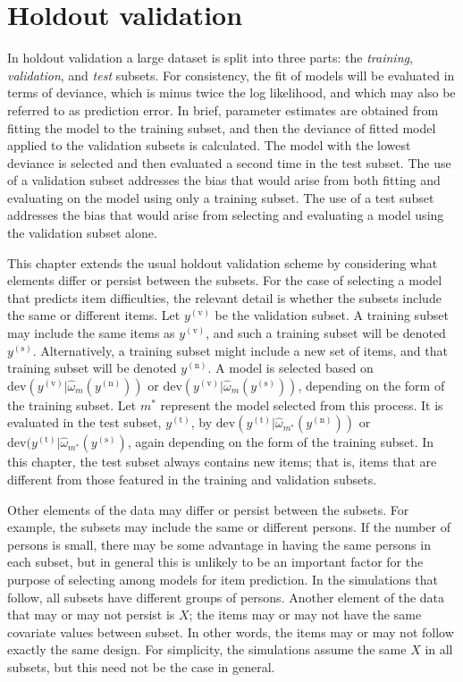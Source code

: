 \section{Holdout validation}

In holdout validation a large dataset is split into three parts: the \emph{training}, \emph{validation}, and \emph{test} subsets. 
For consistency, the fit of models will be evaluated in terms of deviance, which is minus twice the log likelihood, and which may also be referred to as prediction error.
In brief, parameter estimates are obtained from fitting the model to the training subset, and then the deviance of fitted model applied to the validation subsets is calculated. 
The model with the lowest deviance is selected and then evaluated a second time in the test subset.
The use of a validation subset addresses the bias that would arise from both fitting and evaluating on the model using only a training subset.
The use of a test subset addresses the bias that would arise from selecting and evaluating a model using the validation subset alone.

This chapter extends the usual holdout validation scheme by considering what elements differ or persist between the subsets. 
For the case of selecting a model that predicts item difficulties, the relevant detail is whether the subsets include the same or different items. 
Let $y^{(\mathrm{v})}$ be the validation subset. 
A training subset may include the same items as $y^{(\mathrm{v})}$, and such a training subset will be denoted $y^{(\mathrm{s})}$. 
Alternatively, a training subset might include a new set of items, and that training subset will be denoted $y^{(\mathrm{n})}$. 
A model is selected based on 
	$\mathrm{dev}(y^{(\mathrm{v})} | \hat \omega_m(y^{(\mathrm{n})}))$ or
	$\mathrm{dev}(y^{(\mathrm{v})} | \hat \omega_m(y^{(\mathrm{s})}))$, 
	depending on the form of the training subset.
Let $m^*$ represent the model selected from this process.
It is evaluated in the test subset, $y^{(\mathrm{t})}$, by 
	$\mathrm{dev}(y^{(\mathrm{t})} | \hat \omega_{m^*}(y^{(\mathrm{n})}))$ or
	$\mathrm{dev}(y^{(\mathrm{t})} | \hat \omega_{m^*}(y^{(\mathrm{s})})$, 
	again depending on the form of the training subset.
In this chapter, the test subset always contains new items; that is, items that are different from those featured in the training and validation subsets.

Other elements of the data may differ or persist between the subsets. For example, the subsets may include the same or different persons. If the number of persons is small, there may be some advantage in having the same persons in each subset, but in general this is unlikely to be an important factor for the purpose of selecting among models for item prediction. In the simulations that follow, all subsets have different groups of persons. Another element of the data that may or may not persist is $X$; the items may or may not have the same covariate values between subset. In other words, the items may or may not follow exactly the same design. For simplicity, the simulations assume the same $X$ in all subsets, but this need not be the case in general.

